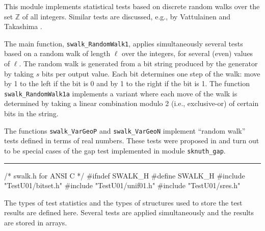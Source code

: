 
This module implements statistical tests based on discrete random walks
 over the set $\mathbb{Z}$ of all integers.
Similar tests are discussed, e.g., by
Vattulainen \cite{rVAT94a,rVAT95a} and Takashima \cite{rTAK96a}.

The main function, {\tt swalk\_RandomWalk1}, applies simultaneously
several tests based on a random walk of length $\ell$ over the
integers, for several (even) values of $\ell$.
The random walk is generated from a bit string produced by the
generator by taking $s$ bits per output value.
Each bit determines one step of the walk: move by 1 to the left
if the bit is 0 and by 1 to the right if the bit is 1.
The function {\tt swalk\_RandomWalk1a} implements a variant
where each move of the walk is determined by taking a linear
combination modulo 2 (i.e., exclusive-or) of certain bits in the string.

The functions {\tt swalk\_VarGeoP} and {\tt swalk\_VarGeoN} implement
``random walk'' tests defined in terms of real numbers.
These tests were proposed in \cite{rSHC97a} and turn out to be special
cases of the gap test implemented in module {\tt sknuth\_gap}.

\resdef

\bigskip\hrule

\code\hide
/* swalk.h  for ANSI C */
#ifndef SWALK_H
#define SWALK_H
\endhide
#include "TestU01/bitset.h"
#include "TestU01/unif01.h"
#include "TestU01/sres.h"
\endcode


\ifdetailed   %



The types of test statistics and the types of structures
used to store the test results are defined here.
Several tests are applied simultaneously and the results are stored
in arrays.


\code

